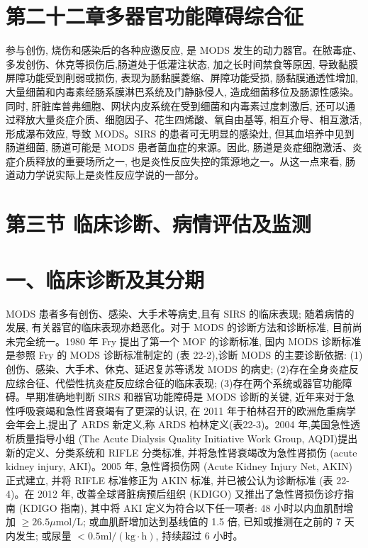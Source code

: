 \documentclass[10pt]{article}
\begin{document}
\section*{第二十二章多器官功能障碍综合征}
参与创伤, 烧伤和感染后的各种应邀反应, 是 MODS 发生的动力器官。在脓毒症、多发创伤、休克等损伤后,肠道处于低灌注状态, 加之长时间禁食等原因, 导致黏膜屏障功能受到削弱或损伤, 表现为肠黏膜菱缩、屏障功能受损, 肠黏膜通透性增加, 大量细菌和内毒素经肠系膜淋巴系统及门静脉侵人, 造成细菌移位及肠源性感染。同时, 肝脏库普弗细胞、网状内皮系统在受到细菌和内毒素过度刺激后, 还可以通过释放大量炎症介质、细胞因子、花生四烯酸、氧自由基等, 相互介导、相互激活,形成瀑布效应, 导致 MODS。SIRS 的患者可无明显的感染灶, 但其血培养中见到肠道细菌, 肠道可能是 MODS 患者菌血症的来源。因此, 肠道是炎症细胞激活、炎症介质释放的重要场所之一, 也是炎性反应失控的策源地之一。从这一点来看, 肠道动力学说实际上是炎性反应学说的一部分。

\section*{第三节 临床诊断、病情评估及监测}
\section*{一、临床诊断及其分期}
MODS 患者多有创伤、感染、大手术等病史,且有 SIRS 的临床表现; 随着病情的发展, 有关器官的临床表现亦趋恶化。对于 MODS 的诊断方法和诊断标准, 目前尚未完全统一。1980 年 Fry 提出了第一个 MOF 的诊断标准, 国内 MODS 诊断标准是参照 Fry 的 MODS 诊断标准制定的 (表 22-2),诊断 MODS 的主要诊断依据: (1)创伤、感染、大手术、休克、延迟复苏等诱发 MODS 的病史; (2)存在全身炎症反应综合征、代偿性抗炎症反应综合征的临床表现; (3)存在两个系统或器官功能障碍。早期准确地判断 SIRS 和器官功能障碍是 MODS 诊断的关键, 近年来对于急性呼吸衰竭和急性肾衰竭有了更深的认识, 在 2011 年于柏林召开的欧洲危重病学会年会上,提出了 ARDS 新定义,称 ARDS 柏林定义(表22-3)。2004 年,美国急性透析质量指导小组 (The Acute Dialysis Quality Initiative Work Group, AQDI)提出新的定义、分类系统和 RIFLE 分类标准, 并将急性肾衰竭改为急性肾损伤 (acute kidney injury, AKI)。2005 年, 急性肾损伤网 (Acute Kidney Injury Net, AKIN) 正式建立, 并将 RIFLE 标准修正为 AKIN 标准, 并已被公认为诊断标准 (表 22-4)。在 2012 年, 改善全球肾脏病预后组织 (KDIGO) 又推出了急性肾损伤诊疗指南 (KDIGO 指南), 其中将 AKI 定义为符合以下任一项者: 48 小时以内血肌酎增加 $\geqslant 26.5 \mu \mathrm{mol} / \mathrm{L}$; 或血肌酐增加达到基线值的 1.5 倍, 已知或推测在之前的 7 天内发生; 或尿量 $<0.5 \mathrm{ml} /(\mathrm{kg} \cdot \mathrm{h})$, 持续超过 6 小时。
\end{document}
